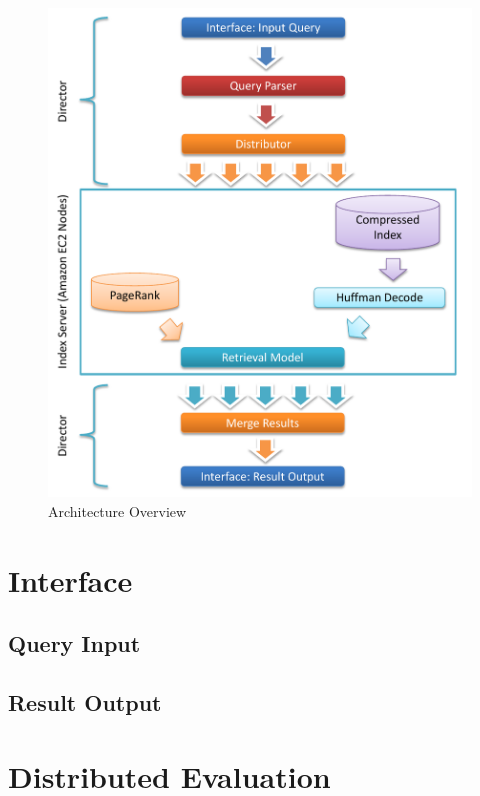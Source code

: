 \documentclass[letterpaper,11pt,twoside]{article}
\begin{document}
\begin{figure}[htb]
 \centering
 \includegraphics[trim=0.0in 0.00in 0.0in 0.0in, clip, page=1]{Architecture.pdf}
 \caption{Architecture Overview}
 \label{fig:Architecture}
\end{figure}

\section{Interface}

\subsection{Query Input}

\subsection{Result Output}

\section{Distributed Evaluation}
\end{document}
